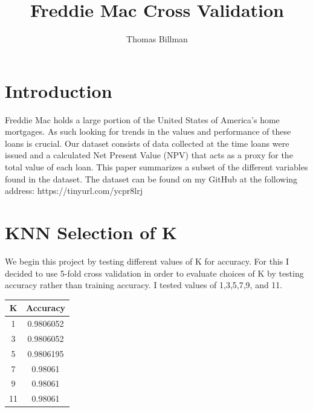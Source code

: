 \documentclass[10pt,twocolumn,letterpaper]{article}
\begin{document}
\title{Freddie Mac Cross Validation}

\author{Thomas Billman}

\maketitle


\section{Introduction}

Freddie Mac holds a large portion of the United States of America's home mortgages. As such looking for trends in the values and performance of these loans is crucial. Our dataset consists of data collected at the time loans were issued and a calculated Net Present Value (NPV) that acts as a proxy for the total value of each loan. This paper summarizes a subset of the different variables found in the dataset. The dataset can be found on my GitHub at the following address:
https://tinyurl.com/ycpr8lrj

\section{KNN Selection of K}
We begin this project by testing different values of K for accuracy. For this I decided to use 5-fold cross validation in order to evaluate choices of K by testing accuracy rather than training accuracy. I tested values of 1,3,5,7,9, and 11.
\begin{center}
\begin{tabular}{ |c|c| } 
	\hline
	K & Accuracy \\ 
	\hline
	1 & 0.9806052 \\
	\hline
	3 & 0.9806052\\ 
	\hline
	5 & 0.9806195\\ 
	\hline
	7 & 0.98061\\ 
	\hline
	9 & 0.98061\\ 
	\hline
	11 & 0.98061\\ 
	\hline
\end{tabular}
\end{center}
\end{document}
